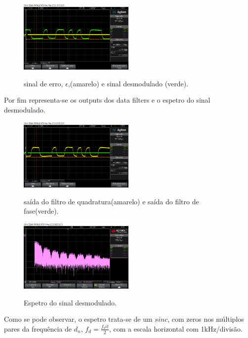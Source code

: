 \documentclass[11pt]{article}
\numberwithin{equation}{section}
\begin{document}
\begin{figure}[H]
	\centering
	\includegraphics[width=0.5\textwidth]{./erro_y1n}~\\
	\caption{sinal de erro, $\epsilon$,(amarelo) e sinal desmodulado (verde).}
	\label{s1_s2}
\end{figure}

Por fim representa-se os outputs dos data filters e o espetro do sinal desmodulado.

\begin{figure}[H]
	\centering
	\includegraphics[width=0.5\textwidth]{./y1_y2n}~\\
	\caption{saída do filtro de quadratura(amarelo) e saída do filtro de fase(verde).}
	\label{espetro}
\end{figure}

\begin{figure}[H]
	\centering
	\includegraphics[width=0.5\textwidth]{./espetro}~\\
	\caption{Espetro do sinal desmodulado.}
	\label{espetro}
\end{figure}

Como se pode observar, o espetro trata-se de um $sinc$, com zeros nos múltiplos pares da frequência de $d_n$, $f_d=\frac{f_bit}{2}$, com a escala horizontal com 1kHz/divisão.
\end{document}

